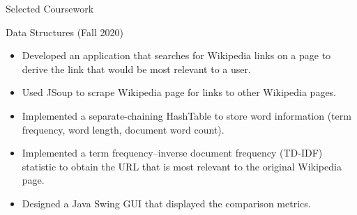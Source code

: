 \documentclass[]{johnsoncv}
\begin{document}
\begin{cvsection}{Selected Coursework}
		\begin{cvsubsection}{Data Structures (Fall 2020)}{}{}
			\begin{itemize}
				\item Developed an application that searches for Wikipedia links on a page to derive the link that would be most relevant to a user.
				\item Used JSoup to scrape Wikipedia page for links to other Wikipedia pages.
				\item Implemented a separate-chaining HashTable to store word information (term frequency, word length, document word count).
				\item Implemented a term frequency–inverse document frequency (TD-IDF) statistic to obtain the URL that is most relevant to the original Wikipedia page.
				\item Designed a Java Swing GUI that displayed the comparison metrics.
			\end{itemize}
		\end{cvsubsection}
	


	\end{cvsection}
\end{document}
